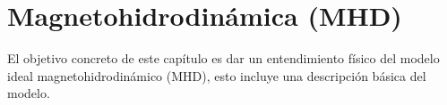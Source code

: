 \chapter{Magnetohidrodinámica (MHD)}


\noindent El objetivo concreto de este capítulo es dar un entendimiento físico del modelo ideal magnetohidrodinámico (MHD), esto incluye una descripción básica del modelo.
\begin{comment}

\noindent El modelo ideal MHD se sitúa bajo la consideración de longitud de onda larga y bajas frecuencias. En este orden de ideas y pretendiendo abarcar la física desde una perspectiva más formal, en la deducción del caso ideal se consideran principios básicos. Utilizando las ecuaciones de Maxwell\eqref{Leygauss},\eqref{divceroB},\eqref{Ampere},\eqref{FM} y la ecuación de Boltzmann\eqref{Boltzmann},



\begin{eqnarray}
\nabla \cdot \vec{E} &=& \frac{\rho}{\epsilon_{0}}\nonumber\\
\nabla \cdot \vec{B} &=& 0\nonumber\\
\nabla\times\vec{B} &=& \mu_{o}\vec{J}+\frac{1}{c^{2}}\frac{\partial \vec{E}}{\partial t}\nonumber\\
\nabla\times\vec{E} &=& \frac{\partial \vec{B}}{\partial t}\nonumber\\
\label{BMHD}
  \left(\frac{\partial f}{\partial t}\right)_{c} &=&\frac{\partial f}{\partial t} + v_{i}\frac{\partial f}{\partial x_{i}} + \frac{q(E_{i}+\varepsilon_{ijk}v_{j}B_{k})}{m}\frac{\partial f}{\partial v_{i}}
\end{eqnarray}

\noindent en particular para describir los fenomenos MHD se incluye el termino de fuerza de Lorentz, además las definiciones de densidad de corriente y densidad de carga 

\begin{eqnarray}
\vec{J} &=& q\int \vec{\xi}f(\vec{x},\vec{\xi},t)d\vec{\xi}\\
\sigma &=& q\int f(\vec{x},\vec{\xi},t)d\vec{\xi} d\vec{\xi}
\end{eqnarray}

\noindent donde $f$ es la función de distribución definida en la sección anterior. En la descripción de Boltzmann se consideran dos tipos de fuerzas que actúan sobre las partículas. La primera de ellas es de largo alcanze y está dada por las fuerzas de Lorentz $q(\vec{E}+\vec{v}\times\vec{B})$ en la cual $\vec{E}$ y $\vec{B}$ son de buen comportamiento en el sentido del calculo diferencial y obtenidos a partir de el vector densidad de corriente y la densidad de carga. La segunda fuerza está asociadada con el operador de colisión\cite{BGK} impuesto en la ecuación de Boltzmann, el cual es una interacción de corto alcance. Es bueno recordar que nuestro parámetro de comparación será el camino libre medio\cite{lecture5}. 

\medskip

\end{comment}
